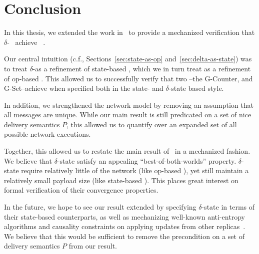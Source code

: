\chapter{Conclusion}
\label{chap:conclusion}

In this thesis, we extended the work in~\citet{gomes17} to provide a mechanized
verification that $\delta$-\CRDTs~\citep{almedia18} achieve
\SEC~\citep{shapiro11}.

Our central intuition (c.f., Sections~\ref{sec:state-as-op}
and~\ref{sec:delta-as-state}) was to treat $\delta$-\CRDTs as a refinement of
state-based \CRDTs, which we in turn treat as a refinement of op-based \CRDTs.
This allowed us to successfully verify that two \CRDTs--the G-Counter, and
G-Set--achieve \SEC when specified both in the state- and $\delta$-state based
style.

In addition, we strengthened the network model by removing an assumption that
all messages are unique. While our main result is still predicated on a set of
nice delivery semantics $P$, this allowed us to quantify over an expanded set of
all possible network executions.

Together, this allowed us to restate the main result of~\citet{almedia18} in a
mechanized fashion. We believe that $\delta$-state \CRDTs satisfy an appealing
``best-of-both-worlds'' property. $\delta$-state \CRDTs require relatively
little of the network (like op-based \CRDTs), yet still maintain a relatively
small payload size (like state-based \CRDTs). This places great interest on
formal verification of their convergence properties.

In the future, we hope to see our result extended by specifying $\delta$-state
\CRDTs in terms of their state-based counterparts, as well as mechanizing
well-known anti-entropy algorithms and causality constraints on applying updates
from other replicas~\citep{almedia18}. We believe that this would be sufficient
to remove the precondition on a set of delivery semantics $P$ from our result.
